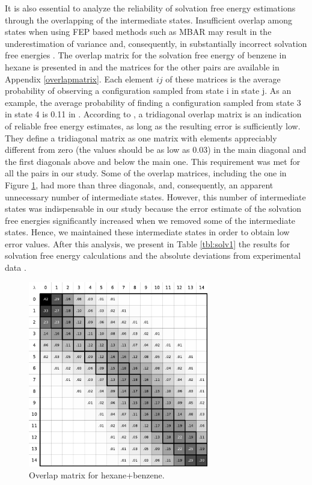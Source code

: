 It is also essential to analyze the reliability of solvation free energy estimations through the overlapping of the intermediate states. Insufficient overlap among states when using FEP based methods such as MBAR may result in the underestimation of variance and, consequently, in substantially incorrect solvation free energies \cite{klimovich}. The overlap matrix for the solvation free energy of benzene in hexane is presented in  and the matrices for the other pairs are available in Appendix \ref{overlapmatrix}. Each element $ij$ of these matrices is the average probability of observing a configuration sampled from state i in state j. As an example, the average probability of finding a configuration sampled from state 3 in state 4 is 0.11 in . According to , a tridiagonal overlap matrix is an indication of reliable free energy estimates, as long as the resulting error is sufficiently low. They define a tridiagonal matrix as one matrix with elements appreciably different from zero (the values should be as low as 0.03) in the main diagonal and the first diagonals above and below the main one. This requirement was met for all the pairs in our study. Some of the overlap matrices, including the one in Figure \ref{fig:hexove}, had more than three diagonals, and, consequently, an apparent unnecessary number of intermediate states. However, this number of intermediate states was indispensable in our study because the error estimate of the solvation free energies significantly increased when we removed some of the intermediate states. Hence, we maintained these intermediate states in order to obtain low error values. After this analysis, we present in Table \ref{tbl:solv1} the results for solvation free energy calculations and the absolute deviations from experimental data \cite{doi:10.1021/ci034120c}.  

\begin{figure}[h]
	\centering
	\includegraphics[width=0.7\textwidth]{Figures/ohex_benz}
	\caption{Overlap matrix for hexane+benzene.}
	\label{fig:hexove}
\end{figure}

